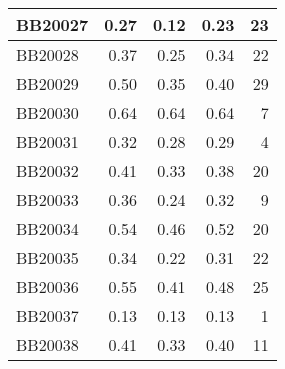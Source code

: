 \begin{longtable}{|l|r|r|r||r|}
	\hline
	BB20027 & \cellcolor[rgb]{ .988,  1,  .992}0.27 & \cellcolor[rgb]{ .384,  .745,  .478}0.12 & \cellcolor[rgb]{ .847,  .941,  .875}0.23 & \cellcolor[rgb]{ .976,  .549,  .557}23 \\
	\hline
	BB20028 & \cellcolor[rgb]{ .988,  1,  .992}0.37 & \cellcolor[rgb]{ .384,  .745,  .478}0.25 & \cellcolor[rgb]{ .839,  .937,  .867}0.34 & \cellcolor[rgb]{ .98,  .569,  .576}22 \\
	\hline
	BB20029 & \cellcolor[rgb]{ .988,  1,  .992}0.50 & \cellcolor[rgb]{ .384,  .745,  .478}0.35 & \cellcolor[rgb]{ .592,  .831,  .655}0.40 & \cellcolor[rgb]{ .976,  .431,  .439}29 \\
	\hline
	BB20030 & \cellcolor[rgb]{ .988,  1,  .992}0.64 & \cellcolor[rgb]{ .988,  1,  .992}0.64 & \cellcolor[rgb]{ .988,  1,  .992}0.64 & \cellcolor[rgb]{ .988,  .855,  .867}7 \\
	\hline
	BB20031 & \cellcolor[rgb]{ .988,  1,  .992}0.32 & \cellcolor[rgb]{ .384,  .745,  .478}0.28 & \cellcolor[rgb]{ .608,  .839,  .671}0.29 & \cellcolor[rgb]{ .988,  .914,  .925}4 \\
	\hline
	BB20032 & \cellcolor[rgb]{ .988,  1,  .992}0.41 & \cellcolor[rgb]{ .384,  .745,  .478}0.33 & \cellcolor[rgb]{ .737,  .894,  .78}0.38 & \cellcolor[rgb]{ .98,  .604,  .616}20 \\
	\hline
	BB20033 & \cellcolor[rgb]{ .988,  1,  .992}0.36 & \cellcolor[rgb]{ .384,  .745,  .478}0.24 & \cellcolor[rgb]{ .784,  .914,  .82}0.32 & \cellcolor[rgb]{ .984,  .816,  .827}9 \\
	\hline
	BB20034 & \cellcolor[rgb]{ .988,  1,  .992}0.54 & \cellcolor[rgb]{ .384,  .745,  .478}0.46 & \cellcolor[rgb]{ .835,  .933,  .863}0.52 & \cellcolor[rgb]{ .98,  .604,  .616}20 \\
	\hline
	BB20035 & \cellcolor[rgb]{ .988,  1,  .992}0.34 & \cellcolor[rgb]{ .384,  .745,  .478}0.22 & \cellcolor[rgb]{ .827,  .933,  .855}0.31 & \cellcolor[rgb]{ .98,  .569,  .576}22 \\
	\hline
	BB20036 & \cellcolor[rgb]{ .988,  1,  .992}0.55 & \cellcolor[rgb]{ .384,  .745,  .478}0.41 & \cellcolor[rgb]{ .678,  .871,  .729}0.48 & \cellcolor[rgb]{ .976,  .51,  .518}25 \\
	\hline
	BB20037 & \cellcolor[rgb]{ .988,  1,  .992}0.13 & \cellcolor[rgb]{ .988,  1,  .992}0.13 & \cellcolor[rgb]{ .988,  1,  .992}0.13 & \cellcolor[rgb]{ .988,  .973,  .984}1 \\
	\hline
	BB20038 & \cellcolor[rgb]{ .988,  1,  .992}0.41 & \cellcolor[rgb]{ .384,  .745,  .478}0.33 & \cellcolor[rgb]{ .894,  .961,  .914}0.40 & \cellcolor[rgb]{ .984,  .78,  .788}11 \\

\end{longtable}
